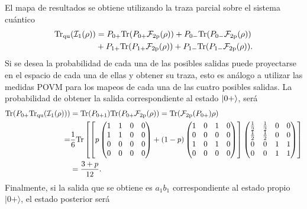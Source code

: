    
El mapa de resultados se obtiene utilizando la traza parcial sobre el sistema cuántico 
\[\begin{split}{\rm Tr}_{\text{qu}}(\mathcal{I}_1(\rho))&=P_{0+}{\rm Tr}(P_{0+}\mathcal{F}_{2\text{p}}(\rho))+P_{0-}{\rm Tr}(P_{0-}\mathcal{F}_{2\text{p}}(\rho))\\
        &+ P_{1+}{\rm Tr}(P_{1+}\mathcal{F}_{2\text{p}}(\rho))+P_{1-}{\rm Tr}( P_{1-}\mathcal{F}_{2\text{p}}(\rho)). \\
\end{split}\]
Si se desea la probabilidad de cada una de las posibles salidas puede
proyectarse en el espacio de cada una de ellas y obtener su traza, esto es
análogo a utilizar las medidas POVM para los mapeos de cada una de las cuatro
posibles salidas. La probabilidad de obtener la salida correspondiente al
estado $|0+\rangle$, será
\[\begin{split}{\rm Tr}(P_{0+}{\rm Tr}_{\text{qu}}(\mathcal{I}_1(\rho)))&={\rm Tr}(P_{0+1}){\rm Tr}(P_{0+}\mathcal{F}_{2\text{p}}(\rho))={\rm Tr}(\mathcal{F}_{2\text{p}}(P_{0+})\rho)\\=&\frac{1}{6}{\rm Tr}\left[\left[p\begin{pmatrix}
            1&1&0&0\\
            1&1&0&0\\
            0&0&0&0\\
            0&0&0&0\\
        \end{pmatrix}+ (1-p)\begin{pmatrix}
            1&0&1&0\\
            0&0&0&0\\
            1&0&1&0\\
            0&0&0&0\\
        \end{pmatrix}\right]\begin{pmatrix}
            \tfrac{1}{2}&\tfrac{1}{2}&0&0\\
            \tfrac{1}{2}&\tfrac{1}{2}&0&0\\
            0&0&1&1\\
            0&0&1&1\\
        \end{pmatrix}\right]\\
        &=\frac{3+p}{12}.\end{split}\] 
Finalmente, si la salida que se obtiene es $a_1 b_1$ correspondiente al estado
propio  $|0+\rangle$, el estado posterior será
